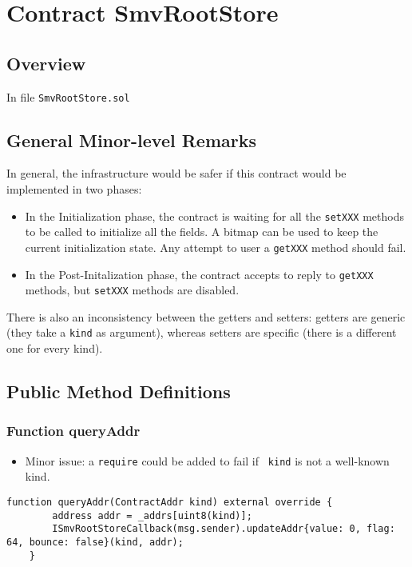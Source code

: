 
\chapter{Contract SmvRootStore}

\minitoc

\section{Overview}


In file {\tt SmvRootStore.sol}

\section{General Minor-level Remarks}

In general, the infrastructure would be safer if this contract would
be implemented in two phases:
\begin{itemize}
\item In the Initialization phase, the contract is waiting for all the
  {\tt setXXX} methods to be called to initialize all the fields. A
  bitmap can be used to keep the current initialization state. Any
  attempt to user a {\tt getXXX} method should fail.
\item In the Post-Initalization phase, the contract accepts to reply
  to {\tt getXXX} methods, but {\tt setXXX} methods are disabled.
\end{itemize}

There is also an inconsistency between the getters and setters:
getters are generic (they take a {\tt kind} as argument), whereas
setters are specific (there is a different one for every kind).

\section{Public Method Definitions}


\subsection{Function queryAddr}

\begin{itemize}
\item Minor issue: a {\tt require} could be added to fail if {\tt
  kind} is not a well-known kind.
\end{itemize}

\begin{lstlisting}[firstnumber=36]
    function queryAddr(ContractAddr kind) external override {
        address addr = _addrs[uint8(kind)];
        ISmvRootStoreCallback(msg.sender).updateAddr{value: 0, flag: 64, bounce: false}(kind, addr);
    }
\end{lstlisting}

